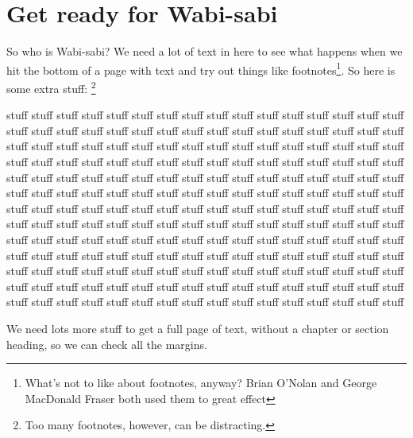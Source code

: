 \documentclass[dissertation]{bsu-cs}  %
\begin{document}
\section{Get ready for Wabi-sabi}\label{sec:getReady}

So who is Wabi-sabi? We need a lot of text in here to see what happens when we hit the bottom of
a page with text and try out things like footnotes\footnote{What's not to like about footnotes,
anyway?  Brian O'Nolan and George MacDonald Fraser both used them to great effect}.
So here is some extra stuff:%
\footnote{Too many footnotes, however, can be distracting.}

stuff stuff stuff stuff stuff stuff stuff stuff stuff stuff stuff stuff stuff
stuff stuff stuff stuff stuff stuff stuff stuff stuff stuff stuff stuff stuff
stuff stuff stuff stuff stuff stuff stuff stuff stuff stuff stuff stuff stuff
stuff stuff stuff stuff stuff stuff stuff stuff stuff stuff stuff stuff stuff
stuff stuff stuff stuff stuff stuff stuff stuff stuff stuff stuff stuff stuff
stuff stuff stuff stuff stuff stuff stuff stuff stuff stuff stuff stuff stuff
stuff stuff stuff stuff stuff stuff stuff stuff stuff stuff stuff stuff stuff
stuff stuff stuff stuff stuff stuff stuff stuff stuff stuff stuff stuff stuff
stuff stuff stuff stuff stuff stuff stuff stuff stuff stuff stuff stuff stuff
stuff stuff stuff stuff stuff stuff stuff stuff stuff stuff stuff stuff stuff
stuff stuff stuff stuff stuff stuff stuff stuff stuff stuff stuff stuff stuff
stuff stuff stuff stuff stuff stuff stuff stuff stuff stuff stuff stuff stuff
stuff stuff stuff stuff stuff stuff stuff stuff stuff stuff stuff stuff stuff
stuff stuff stuff stuff stuff stuff stuff stuff stuff stuff stuff stuff stuff
stuff stuff stuff stuff stuff stuff stuff stuff stuff stuff stuff stuff stuff
stuff stuff stuff stuff stuff stuff stuff stuff stuff stuff stuff stuff stuff

We need lots more stuff to get a full page of text, without a chapter or section heading,
so we can check all the margins.
\end{document}
